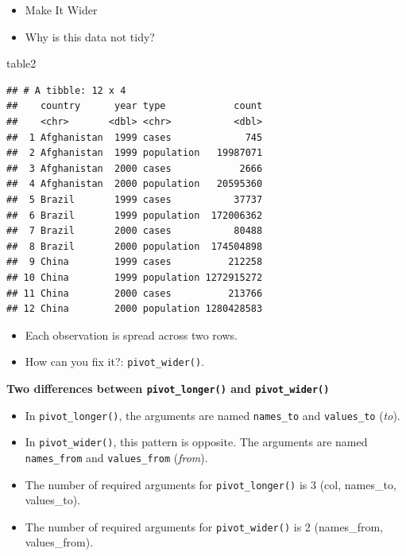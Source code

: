 \documentclass[
]{book}
\newenvironment{Shaded}{\begin{snugshade}}{\end{snugshade}}
\newcommand{\NormalTok}[1]{#1}
\begin{document}
\begin{itemize}
\item
  Make It Wider
\item
  Why is this data not tidy?
\end{itemize}

\begin{Shaded}
\begin{Highlighting}[]
\NormalTok{table2}
\end{Highlighting}
\end{Shaded}

\begin{verbatim}
## # A tibble: 12 x 4
##    country      year type            count
##    <chr>       <dbl> <chr>           <dbl>
##  1 Afghanistan  1999 cases             745
##  2 Afghanistan  1999 population   19987071
##  3 Afghanistan  2000 cases            2666
##  4 Afghanistan  2000 population   20595360
##  5 Brazil       1999 cases           37737
##  6 Brazil       1999 population  172006362
##  7 Brazil       2000 cases           80488
##  8 Brazil       2000 population  174504898
##  9 China        1999 cases          212258
## 10 China        1999 population 1272915272
## 11 China        2000 cases          213766
## 12 China        2000 population 1280428583
\end{verbatim}

\begin{itemize}
\item
  Each observation is spread across two rows.
\item
  How can you fix it?: \texttt{pivot\_wider()}.
\end{itemize}

\textbf{Two differences between \texttt{pivot\_longer()} and \texttt{pivot\_wider()}}

\begin{itemize}
\item
  In \texttt{pivot\_longer()}, the arguments are named \texttt{names\_to} and \texttt{values\_to} (\emph{to}).
\item
  In \texttt{pivot\_wider()}, this pattern is opposite. The arguments are named \texttt{names\_from} and \texttt{values\_from} (\emph{from}).
\item
  The number of required arguments for \texttt{pivot\_longer()} is 3 (col, names\_to, values\_to).
\item
  The number of required arguments for \texttt{pivot\_wider()} is 2 (names\_from, values\_from).
\end{itemize}
\end{document}
